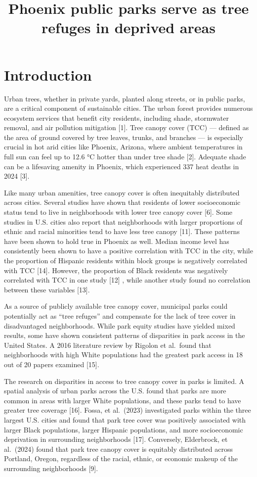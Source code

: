 \documentclass[
  sn-basic,
]{sn-jnl}
\title[Phoenix public parks serve as tree refuges in deprived
areas]{Phoenix public parks serve as tree refuges in deprived areas}
\author*[1]{\fnm{Sean} \sur{Whitcomb}}\email{sean.whitcomb@mesacc.edu}
\affil[1]{, \orgname{Mesa Community College}}
\begin{document}
\maketitle


\section{Introduction}\label{sec-introduction}

Urban trees, whether in private yards, planted along streets, or in
public parks, are a critical component of sustainable cities. The urban
forest provides numerous ecosystem services that benefit city residents,
including shade, stormwater removal, and air pollution mitigation
{[}1{]}. Tree canopy cover (TCC) --- defined as the area of ground
covered by tree leaves, trunks, and branches --- is especially crucial
in hot arid cities like Phoenix, Arizona, where ambient temperatures in
full sun can feel up to 12.6 °C hotter than under tree shade {[}2{]}.
Adequate shade can be a lifesaving amenity in Phoenix, which experienced
337 heat deaths in 2024 {[}3{]}.

Like many urban amenities, tree canopy cover is often inequitably
distributed across cities. Several studies have shown that residents of
lower socioeconomic status tend to live in neighborhoods with lower tree
canopy cover {[}6{]}. Some studies in U.S. cities also report that
neighborhoods with larger proportions of ethnic and racial minorities
tend to have less tree canopy {[}11{]}. These patterns have been shown
to hold true in Phoenix as well. Median income level has consistently
been shown to have a positive correlation with TCC in the city, while
the proportion of Hispanic residents within block groups is negatively
correlated with TCC {[}14{]}. However, the proportion of Black residents
was negatively correlated with TCC in one study {[}12{]} , while another
study found no correlation between these variables {[}13{]}.

As a source of publicly available tree canopy cover, municipal parks
could potentially act as ``tree refuges'' and compensate for the lack of
tree cover in disadvantaged neighborhoods. While park equity studies
have yielded mixed results, some have shown consistent patterns of
disparities in park access in the United States. A 2016 literature
review by Rigolon et al.~found that neighborhoods with high White
populations had the greatest park access in 18 out of 20 papers examined
{[}15{]}.

The research on disparities in access to tree canopy cover in parks is
limited. A spatial analysis of urban parks across the U.S. found that
parks are more common in areas with larger White populations, and these
parks tend to have greater tree coverage {[}16{]}. Fossa, et al.~(2023)
investigated parks within the three largest U.S. cities and found that
park tree cover was positively associated with larger Black populations,
larger Hispanic populations, and more socioeconomic deprivation in
surrounding neighborhoods {[}17{]}. Conversely, Elderbrock, et
al.~(2024) found that park tree canopy cover is equitably distributed
across Portland, Oregon, regardless of the racial, ethnic, or economic
makeup of the surrounding neighborhoods {[}9{]}.
\end{document}
